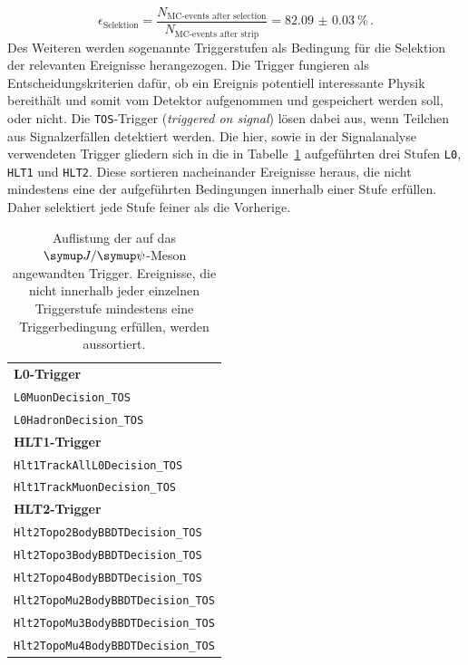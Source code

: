 %
\begin{equation}
  \epsilon_\text{Selektion}=\frac{N_\text{MC-events after selection}}{N_\text{MC-events after strip}}=\SI{82.09(3)}{\percent} \, .%
  \label{eq:eff_strip1}
\end{equation}
%
Des Weiteren werden sogenannte Triggerstufen als Bedingung für die Selektion der relevanten Ereignisse herangezogen. Die Trigger fungieren als Entscheidungskriterien dafür, ob ein Ereignis potentiell interessante Physik bereithält und somit vom Detektor aufgenommen und gespeichert werden soll, oder nicht. Die \texttt{TOS}-Trigger (\textit{triggered on signal}) lösen dabei aus, wenn Teilchen aus Signalzerfällen detektiert werden. Die hier, sowie in der Signalanalyse \cite{ba-maik} verwendeten Trigger gliedern sich in die in Tabelle~\ref{tab:trigger} aufgeführten drei Stufen \texttt{L0}, \texttt{HLT1} und \texttt{HLT2}. Diese sortieren nacheinander Ereignisse heraus, die nicht mindestens eine der aufgeführten Bedingungen innerhalb einer Stufe erfüllen. Daher selektiert jede Stufe feiner als die Vorherige.
%
\begin{table}[htb]
  \centering
  \caption{Auflistung der auf das $\jpsi$-Meson angewandten Trigger.
  Ereignisse, die nicht innerhalb jeder einzelnen Triggerstufe mindestens eine Triggerbedingung erfüllen, werden aussortiert.}
  \begin{tabular}{l}
    \toprule
    \textbf{L0-Trigger}                                 \\
    \quad\texttt{L0MuonDecision\_TOS}              \\
    \quad\texttt{L0HadronDecision\_TOS}            \\
    \midrule
    \textbf{HLT1-Trigger}                               \\
    \quad\texttt{Hlt1TrackAllL0Decision\_TOS}      \\
    \quad\texttt{Hlt1TrackMuonDecision\_TOS}       \\
    \midrule
    \textbf{HLT2-Trigger}                               \\
    \quad\texttt{Hlt2Topo2BodyBBDTDecision\_TOS}   \\
    \quad\texttt{Hlt2Topo3BodyBBDTDecision\_TOS}   \\
    \quad\texttt{Hlt2Topo4BodyBBDTDecision\_TOS}   \\
    \quad\texttt{Hlt2TopoMu2BodyBBDTDecision\_TOS} \\
    \quad\texttt{Hlt2TopoMu3BodyBBDTDecision\_TOS} \\
    \quad\texttt{Hlt2TopoMu4BodyBBDTDecision\_TOS} \\
    \bottomrule
  \end{tabular}
  \label{tab:trigger}
\end{table}
